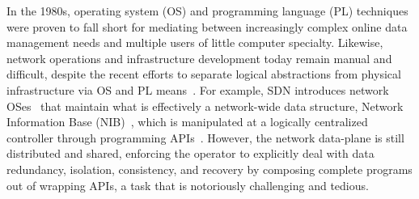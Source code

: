 \label{sec:intro}


In the 1980s, operating system (OS) and programming language (PL)
techniques were proven to fall short for mediating between
increasingly complex online data management needs and multiple users
of little computer specialty. Likewise, network operations and
infrastructure development today remain manual and difficult, despite the
recent efforts to separate logical abstractions from physical
infrastructure via OS and PL
means~\cite{ethane-sigcomm07,rethinking-enterprise,shenker-tue}. For
example, SDN introduces network OSes~\cite{onix,nox} that maintain
what is effectively a
network-wide data structure, \eg Network Information Base
(NIB)~\cite{onix}, which is manipulated at a logically centralized
controller through programming
APIs~\cite{composing,sdn-lang-frenetic}. However, the network
data-plane is still distributed and shared, enforcing the operator to
explicitly deal with data redundancy, isolation, consistency, and
recovery by composing complete programs out of wrapping APIs, a task
that is notoriously challenging and tedious.  



